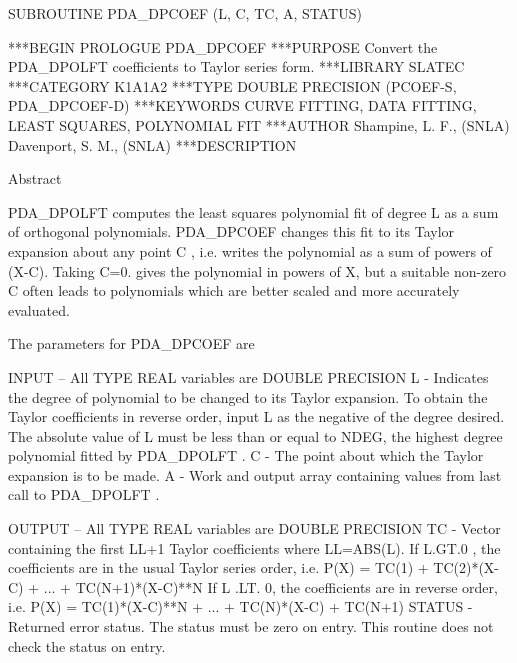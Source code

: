 \documentclass[11pt,twoside,nolof]{starlink}
\begin{document}


\begin{terminalv}
      SUBROUTINE PDA_DPCOEF (L, C, TC, A, STATUS)


***BEGIN PROLOGUE  PDA_DPCOEF
***PURPOSE  Convert the PDA_DPOLFT coefficients to Taylor series form.
***LIBRARY   SLATEC
***CATEGORY  K1A1A2
***TYPE      DOUBLE PRECISION (PCOEF-S, PDA_DPCOEF-D)
***KEYWORDS  CURVE FITTING, DATA FITTING, LEAST SQUARES, POLYNOMIAL FIT
***AUTHOR  Shampine, L. F., (SNLA)
           Davenport, S. M., (SNLA)
***DESCRIPTION

     Abstract

     PDA_DPOLFT  computes the least squares polynomial fit of degree  L  as
     a sum of orthogonal polynomials.  PDA_DPCOEF  changes this fit to its
     Taylor expansion about any point  C , i.e. writes the polynomial
     as a sum of powers of (X-C).  Taking  C=0.  gives the polynomial
     in powers of X, but a suitable non-zero  C  often leads to
     polynomials which are better scaled and more accurately evaluated.

     The parameters for  PDA_DPCOEF  are

     INPUT -- All TYPE REAL variables are DOUBLE PRECISION
         L -      Indicates the degree of polynomial to be changed to
                  its Taylor expansion.  To obtain the Taylor
                  coefficients in reverse order, input  L  as the
                  negative of the degree desired.  The absolute value
                  of L  must be less than or equal to NDEG, the highest
                  degree polynomial fitted by  PDA_DPOLFT .
         C -      The point about which the Taylor expansion is to be
                  made.
         A -      Work and output array containing values from last
                  call to  PDA_DPOLFT .

     OUTPUT -- All TYPE REAL variables are DOUBLE PRECISION
         TC -     Vector containing the first LL+1 Taylor coefficients
                  where LL=ABS(L).  If  L.GT.0 , the coefficients are
                  in the usual Taylor series order, i.e.
                    P(X) = TC(1) + TC(2)*(X-C) + ... + TC(N+1)*(X-C)**N
                  If L .LT. 0, the coefficients are in reverse order,
                  i.e.
                    P(X) = TC(1)*(X-C)**N + ... + TC(N)*(X-C) + TC(N+1)
         STATUS - Returned error status.
                  The status must be zero on entry. This
                  routine does not check the status on entry.


\end{terminalv}
\end{document}
